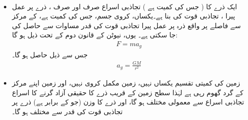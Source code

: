 \\
\begin{itemize}
\item
ایک ذرے کا ( جس کی کمیت  ہے ) تجاذبی اسراع    صرف اور صرف ، ذرے پر عمل پیرا  ، تجاذبی قوت کی بنا ہے۔یکساں، کروی جسم، جس کی کمیت  ہے، کے مرکز  سے  فاصلے پر واقع ذرہ پر عمل پیرا  تجاذبی قوت کی قدر   مساوات    سے حاصل کی جا سکتی ہے۔ یوں، نیوٹن کے قانون دوم کے تحت ذیل ہو گا:
\begin{align*}
F=ma_g
\end{align*}
جس سے ذیل حاصل ہو گا۔
\begin{align*}
a_g=\frac{GM}{r^2}
\end{align*}
\item
زمین کی کمیتی تقسیم  یکساں نہیں،  زمین مکمل کروی نہیں، اور  زمین اپنے مرکز کے گرد  گھوم رہی ہے لہٰذا  سطح زمین کے قریب ذرے کا حقیقی آزاد  گرنے کا    اسراع  تجاذبی اسراع   سے معمولی مختلف ہو گا، اور  ذرے کا وزن (جو  کے برابر ہے) ذرے پر تجاذبی قوت  کی قدر سے مختلف ہو گا۔
\end{itemize}

